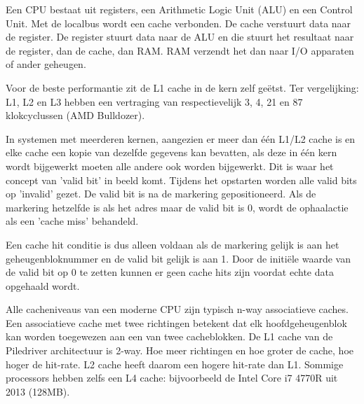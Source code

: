 Een CPU bestaat uit registers, een Arithmetic Logic Unit (ALU) en een Control Unit. 
Met de localbus wordt een cache verbonden. De cache verstuurt data naar de register. 
De register stuurt data naar de ALU en die stuurt het resultaat naar de register, dan de cache, dan RAM. 
RAM verzendt het dan naar I/O apparaten of ander geheugen.

Voor de beste performantie zit de L1 cache in de kern zelf geëtst.
Ter vergelijking: L1, L2 en L3 hebben een vertraging van respectievelijk 3, 4, 21 en 87 klokcyclussen (AMD Bulldozer).

In systemen met meerderen kernen, aangezien er meer dan één L1/L2 cache is en elke cache een kopie van dezelfde gegevens kan bevatten, als deze in één kern wordt bijgewerkt moeten alle andere ook worden bijgewerkt.
Dit is waar het concept van 'valid bit' in beeld komt.
Tijdens het opstarten worden alle valid bits op 'invalid' gezet. De valid bit is na de markering gepositioneerd.
Als de markering hetzelfde is als het adres maar de valid bit is 0, wordt de ophaalactie als een 'cache miss' behandeld.

Een cache hit conditie is dus alleen voldaan als de markering gelijk is aan het geheugenbloknummer en de valid bit gelijk is aan 1. Door de initiële waarde van de valid bit op 0 te zetten kunnen er geen cache hits zijn voordat echte data opgehaald wordt.

Alle cacheniveaus van een moderne CPU zijn typisch n-way associatieve caches. Een associatieve cache met twee richtingen betekent dat elk hoofdgeheugenblok kan worden toegewezen aan een van twee cacheblokken. De L1 cache van de Piledriver architectuur is 2-way.\parencite{Hruska2017}
Hoe meer richtingen en hoe groter de cache, hoe hoger de hit-rate. L2 cache heeft daarom een hogere hit-rate dan L1.
Sommige processors hebben zelfs een L4 cache: bijvoorbeeld de Intel Core i7 4770R uit 2013 (128MB).

